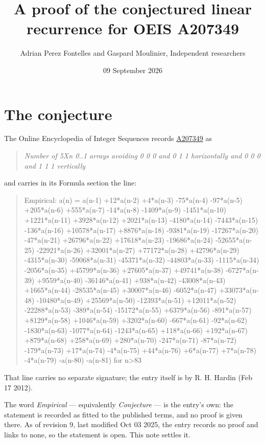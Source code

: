 \documentclass[11pt]{article}
\title{A proof of the conjectured linear recurrence for OEIS A207349}
\author{Adrian Perez Fontelles and Gaspard Moulinier, Independent researchers}
\date{09 September 2026}
\theoremstyle{definition}
\begin{document}
\maketitle
\section{The conjecture}

The Online Encyclopedia of Integer Sequences records \href{https://oeis.org/A207349}{A207349} as

\begin{quote}\itshape Number of 5Xn 0..1 arrays avoiding 0 0 0 and 0 1 1 horizontally and 0 0 0 and 1 1 1 vertically\end{quote}

and carries in its Formula section the line:

\begin{quote}\ttfamily Empirical: a(n) = a(n-1) +12*a(n-2) +4*a(n-3) -75*a(n-4) -97*a(n-5) +205*a(n-6) +555*a(n-7) -14*a(n-8) -1409*a(n-9) -1451*a(n-10) +1221*a(n-11) +3928*a(n-12) +2021*a(n-13) -4180*a(n-14) -7443*a(n-15) -136*a(n-16) +10578*a(n-17) +8876*a(n-18) -9381*a(n-19) -17267*a(n-20) -47*a(n-21) +26796*a(n-22) +17618*a(n-23) -19686*a(n-24) -52655*a(n-25) -22921*a(n-26) +32001*a(n-27) +77172*a(n-28) +42796*a(n-29) -4315*a(n-30) -59068*a(n-31) -45371*a(n-32) -44803*a(n-33) -1115*a(n-34) -2056*a(n-35) +45799*a(n-36) +27605*a(n-37) +49741*a(n-38) -6727*a(n-39) +9559*a(n-40) -36146*a(n-41) +938*a(n-42) -43008*a(n-43) +1665*a(n-44) -28535*a(n-45) +30007*a(n-46) -6052*a(n-47) +33073*a(n-48) -10480*a(n-49) +25569*a(n-50) -12393*a(n-51) +12011*a(n-52) -22288*a(n-53) -389*a(n-54) -15172*a(n-55) +6379*a(n-56) -891*a(n-57) +8129*a(n-58) +1046*a(n-59) +3202*a(n-60) -667*a(n-61) -92*a(n-62) -1830*a(n-63) -1077*a(n-64) -1243*a(n-65) +118*a(n-66) +192*a(n-67) +879*a(n-68) +258*a(n-69) +280*a(n-70) -247*a(n-71) -87*a(n-72) -179*a(n-73) +17*a(n-74) -4*a(n-75) +44*a(n-76) +6*a(n-77) +7*a(n-78) -4*a(n-79) -a(n-80) -a(n-81) for n>83\end{quote}

That line carries no separate signature; the entry itself is by R. H. Hardin (Feb 17 2012).

The word {\itshape Empirical} --- equivalently {\itshape Conjecture} --- is the entry's own: the statement is recorded as fitted to the published terms, and no proof is given there. As of revision 9, last modified Oct 03 2025, the entry records no proof and links to none, so the statement is open. This note settles it.
\end{document}
